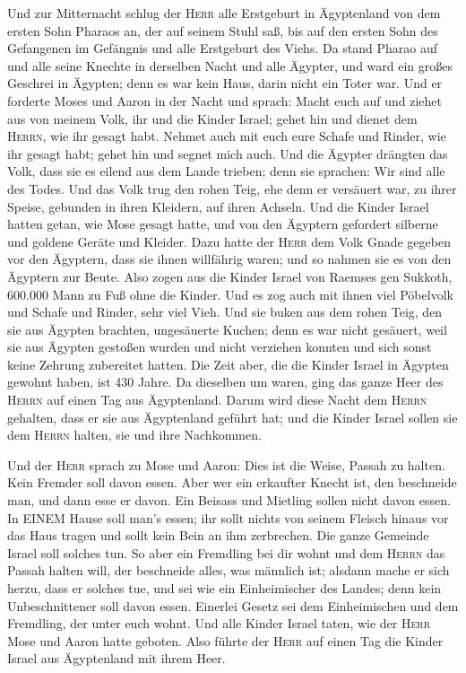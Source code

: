  Und zur Mitternacht schlug der \textsc{Herr} alle
Erstgeburt in Ägyptenland von dem ersten Sohn Pharaos an, der auf seinem
Stuhl saß, bis auf den ersten Sohn des Gefangenen im Gefängnis und alle
Erstgeburt des Viehs.  Da stand Pharao auf und alle seine
Knechte in derselben Nacht und alle Ägypter, und ward ein großes
Geschrei in Ägypten; denn es war kein Haus, darin nicht ein Toter war.
 Und er forderte Moses und Aaron in der Nacht und sprach:
Macht euch auf und ziehet aus von meinem Volk, ihr und die Kinder
Israel; gehet hin und dienet dem \textsc{Herrn}, wie ihr gesagt habt.
 Nehmet auch mit euch eure Schafe und Rinder, wie ihr
gesagt habt; gehet hin und segnet mich auch.  Und die
Ägypter drängten das Volk, dass sie es eilend aus dem Lande trieben;
denn sie sprachen: Wir sind alle des Todes.  Und das Volk
trug den rohen Teig, ehe denn er versäuert war, zu ihrer Speise,
gebunden in ihren Kleidern, auf ihren Achseln.  Und die
Kinder Israel hatten getan, wie Mose gesagt hatte, und von den Ägyptern
gefordert silberne und goldene Geräte und Kleider.  Dazu
hatte der \textsc{Herr} dem Volk Gnade gegeben vor den Ägyptern, dass
sie ihnen willfährig waren; und so nahmen sie es von den Ägyptern zur
Beute.  Also zogen aus die Kinder Israel von Raemses gen
Sukkoth, 600.000 Mann zu Fuß ohne die Kinder.  Und es zog
auch mit ihnen viel Pöbelvolk und Schafe und Rinder, sehr viel Vieh.
 Und sie buken aus dem rohen Teig, den sie aus Ägypten
brachten, ungesäuerte Kuchen; denn es war nicht gesäuert, weil sie aus
Ägypten gestoßen wurden und nicht verziehen konnten und sich sonst keine
Zehrung zubereitet hatten.  Die Zeit aber, die die Kinder
Israel in Ägypten gewohnt haben, ist 430 Jahre.  Da
dieselben um waren, ging das ganze Heer des \textsc{Herrn} auf einen Tag
aus Ägyptenland.  Darum wird diese Nacht dem
\textsc{Herrn} gehalten, dass er sie aus Ägyptenland geführt hat; und
die Kinder Israel sollen sie dem \textsc{Herrn} halten, sie und ihre
Nachkommen.

 Und der \textsc{Herr} sprach zu Mose und Aaron: Dies ist
die Weise, Passah zu halten. Kein Fremder soll davon essen.
 Aber wer ein erkaufter Knecht ist, den beschneide man,
und dann esse er davon.  Ein Beisass und Mietling sollen
nicht davon essen.  In EINEM Hause soll man's essen; ihr
sollt nichts von seinem Fleisch hinaus vor das Haus tragen und sollt
kein Bein an ihm zerbrechen.  Die ganze Gemeinde Israel
soll solches tun.  So aber ein Fremdling bei dir wohnt
und dem \textsc{Herrn} das Passah halten will, der beschneide alles, was
männlich ist; alsdann mache er sich herzu, dass er solches tue, und sei
wie ein Einheimischer des Landes; denn kein Unbeschnittener soll davon
essen.  Einerlei Gesetz sei dem Einheimischen und dem
Fremdling, der unter euch wohnt.  Und alle Kinder Israel
taten, wie der \textsc{Herr} Mose und Aaron hatte geboten.
 Also führte der \textsc{Herr} auf einen Tag die Kinder
Israel aus Ägyptenland mit ihrem Heer.


